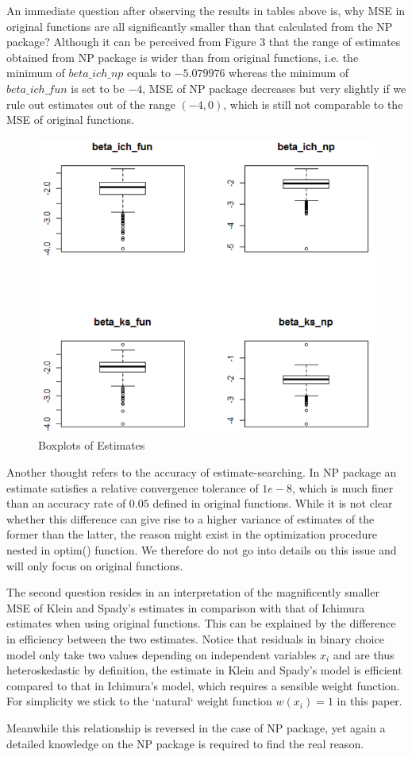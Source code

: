 \documentclass[a4paper]{article}
\begin{document}
An immediate question after observing the results in tables above is, why MSE in original functions are all significantly smaller than that calculated from the NP package?
Although it can be perceived from Figure 3 that the range of estimates obtained from NP package is wider than from original functions, i.e. the minimum of $beta\_ich\_np$ equals to $-5.079976$ whereas the minimum of $beta\_ich\_fun$ is set to be $-4$, MSE of NP package decreases but very slightly if we rule out estimates out of the range $(-4,0)$, which is still not comparable to the MSE of original functions. 

\begin{figure}[h!]
  \caption{Boxplots of Estimates}
  \includegraphics[width=\linewidth]{boxplot_beta.png}
 
  \label{fig:boxplots of estimates}
\end{figure}

Another thought refers to the accuracy of estimate-searching. In NP package an estimate satisfies a relative convergence tolerance of $1e-8$, which is much finer than an accuracy rate of $0.05$ defined in original functions. While it is not clear whether this difference can give rise to a higher variance of estimates of the former than the latter, the reason might exist in the optimization procedure nested in optim() function. We therefore do not go into details on this issue and will only focus on original functions.

The second question resides in an interpretation of the magnificently smaller MSE of Klein and Spady's estimates in comparison with that of Ichimura estimates when using original functions. This can be explained by the difference in efficiency between the two estimates. Notice that residuals in binary choice model only take two values depending on independent variables $x_i$ and are thus heteroskedastic by definition, the estimate in Klein and Spady's model is efficient compared to that in Ichimura's model, which requires a sensible weight function. For simplicity we stick to the `natural` weight function $w(x_i)=1$ in this paper. 

Meanwhile this relationship is reversed in the case of NP package, yet again a detailed knowledge on the NP package is required to find the real reason. 
\end{document}
